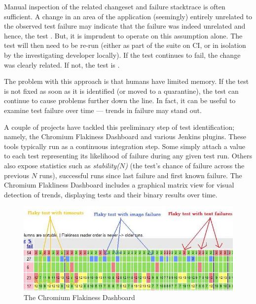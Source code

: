 Manual inspection of the related changeset and failure stacktrace is often
sufficient. A change in an area of the application (seemingly) entirely
unrelated to the observed test failure may indicate that the failure was indeed
unrelated and hence, the test \flaky. But, it is imprudent to operate on this
assumption alone. The test will then need to be re-run (either as part of the
suite on CI, or in isolation by the investigating developer locally). If the
test continues to fail, the change was clearly related. If not, the test is
\flaky.

The problem with this approach is that humans have limited memory. If the \flaky
test is not fixed as soon as it is identified (or moved to a quarantine), the
test can continue to cause problems further down the line. In fact, it can be
useful to examine test failure over time --- trends in failure may stand out.

A couple of projects have tackled this preliminary step of \flaky test
identification; namely, the Chromium Flakiness Dashboard
\cite{flakinessDashboard} and various Jenkins plugins. These tools typically run
as a continuous integration step. Some simply attach a value to each test
representing its likelihood of failure during any given test run. Others also
expose statistics such as \emph{stability($N$)} (the test's chance of failure
across the previous $N$ runs), successful runs since last failure and first
known failure. The Chromium Flakliness Dashboard includes a graphical matrix
view for visual detection of trends, displaying tests and their binary results
over time.

\begin{figure}[h]

\includegraphics[width=\linewidth]{Images/chromium_flaky_dashboard}

\caption{The Chromium Flakiness Dashboard \cite{flakinessDashboard}}
\label{fig:chromium_dashboard}
\end{figure}

